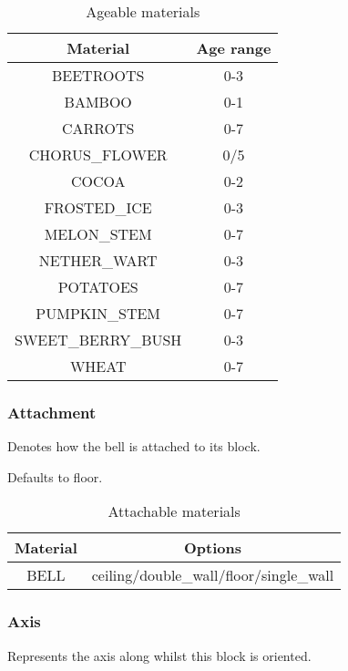 \begin{table}[H]
	\centering
	\begin{tabular}{ |c|c| }
		\hline
		Material & Age range \\
		\hline
		BEETROOTS & 0-3 \\
		BAMBOO & 0-1 \\
		CARROTS & 0-7 \\
		CHORUS\_FLOWER & 0/5\footnotemark \\
		COCOA & 0-2 \\
		FROSTED\_ICE & 0-3 \\
		MELON\_STEM & 0-7 \\
		NETHER\_WART & 0-3 \\
		POTATOES & 0-7 \\
		PUMPKIN\_STEM & 0-7 \\
		SWEET\_BERRY\_BUSH & 0-3 \\
		WHEAT & 0-7 \\
		\hline
	\end{tabular}
	\caption{Ageable materials}
\end{table}


\subsubsection{Attachment}
Denotes how the bell is attached to its block.

Defaults to floor.

\begin{table}[H]
	\centering
	\begin{tabular}{ |c|c| }
		\hline
		Material & Options \\
		\hline
		BELL & ceiling/double\_wall/floor/single\_wall \\
		\hline
	\end{tabular}
	\caption{Attachable materials}
\end{table}

\subsubsection{Axis}
Represents the axis along whilst this block is oriented.

